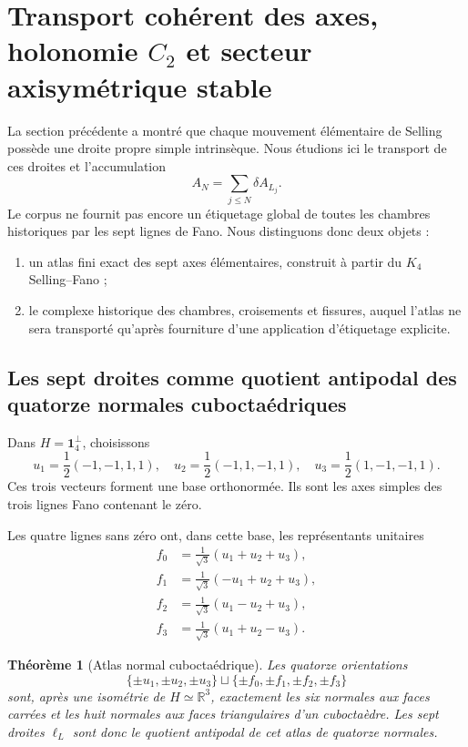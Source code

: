 \documentclass[11pt,a4paper]{article}
\newtheorem{theorem}{Théorème}[section]
\newcommand{\R}{\mathbb R}
\begin{document}
\section{Transport cohérent des axes, holonomie \texorpdfstring{$C_2$}{C2} et secteur axisymétrique stable}\label{sec:v14-axis-holonomy}

La section précédente a montré que chaque mouvement élémentaire de Selling possède une droite propre simple intrinsèque. Nous étudions ici le transport de ces droites et l'accumulation
\[
 A_N=\sum_{j\le N}\delta A_{L_j}.
\]
Le corpus ne fournit pas encore un étiquetage global de toutes les chambres historiques par les sept lignes de Fano. Nous distinguons donc deux objets :
\begin{enumerate}[label=\textup{(\roman*)}]
\item un atlas fini exact des sept axes élémentaires, construit à partir du $K_4$ Selling--Fano ;
\item le complexe historique des chambres, croisements et fissures, auquel l'atlas ne sera transporté qu'après fourniture d'une application d'étiquetage explicite.
\end{enumerate}

\subsection{Les sept droites comme quotient antipodal des quatorze normales cuboctaédriques}

Dans $H=\mathbf1_4^\perp$, choisissons
\begin{equation}\label{eq:v14-ui}
 u_1=\frac12(-1,-1,1,1),\quad
 u_2=\frac12(-1,1,-1,1),\quad
 u_3=\frac12(1,-1,-1,1).
\end{equation}
Ces trois vecteurs forment une base orthonormée. Ils sont les axes simples des trois lignes Fano contenant le zéro.

Les quatre lignes sans zéro ont, dans cette base, les représentants unitaires
\begin{equation}\label{eq:v14-fa}
 \begin{aligned}
 f_0&=\frac1{\sqrt3}(u_1+u_2+u_3),\\
 f_1&=\frac1{\sqrt3}(-u_1+u_2+u_3),\\
 f_2&=\frac1{\sqrt3}(u_1-u_2+u_3),\\
 f_3&=\frac1{\sqrt3}(u_1+u_2-u_3).
 \end{aligned}
\end{equation}

\begin{theorem}[Atlas normal cuboctaédrique]\label{thm:v14-cubo-atlas}
Les quatorze orientations
\[
 \{\pm u_1,\pm u_2,\pm u_3\}
 \sqcup
 \{\pm f_0,\pm f_1,\pm f_2,\pm f_3\}
\]
sont, après une isométrie de $H\simeq\R^3$, exactement les six normales aux faces carrées et les huit normales aux faces triangulaires d'un cuboctaèdre. Les sept droites $\ell_L$ sont donc le quotient antipodal de cet atlas de quatorze normales.
\end{theorem}
\end{document}
